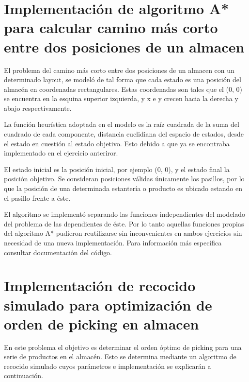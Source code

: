 \documentclass[
]{article}
\begin{document}
\hypertarget{implementaciuxf3n-de-algoritmo-a-para-calcular-camino-muxe1s-corto-entre-dos-posiciones-de-un-almacen}{%
\section{Implementación de algoritmo A* para calcular camino más corto
entre dos posiciones de un
almacen}\label{implementaciuxf3n-de-algoritmo-a-para-calcular-camino-muxe1s-corto-entre-dos-posiciones-de-un-almacen}}

El problema del camino más corto entre dos posiciones de un almacen con
un determinado layout, se modeló de tal forma que cada estado es una
posición del almacén en coordenadas rectangulares. Estas coordenadas son
tales que el (0, 0) se encuentra en la esquina superior izquierda, y x e
y crecen hacia la derecha y abajo respectivamente.

La función heurística adoptada en el modelo es la raíz cuadrada de la
suma del cuadrado de cada componente, distancia euclidiana del espacio
de estados, desde el estado en cuestión al estado objetivo. Esto debido
a que ya se encontraba implementado en el ejercicio anteriror.

El estado inicial es la posición inicial, por ejemplo (0, 0), y el
estado final la posición objetivo. Se consideran posiciones válidas
únicamente los pasillos, por lo que la posición de una determinada
estantería o producto es ubicado estando en el pasillo frente a éste.

El algoritmo se implementó separando las funciones independientes del
modelado del problema de las dependientes de éste. Por lo tanto aquellas
funciones propias del algoritmo A* pudieron reutilizarse sin
inconvenientes en ambos ejercicios sin necesidad de una nueva
implementación. Para información más específica consultar documentación
del código.

\hypertarget{implementaciuxf3n-de-recocido-simulado-para-optimizaciuxf3n-de-orden-de-picking-en-almacen}{%
\section{Implementación de recocido simulado para optimización de orden
de picking en
almacen}\label{implementaciuxf3n-de-recocido-simulado-para-optimizaciuxf3n-de-orden-de-picking-en-almacen}}

En este problema el objetivo es determinar el orden óptimo de picking
para una serie de productos en el almacén. Esto se determina mediante un
algoritmo de recocido simulado cuyos parámetros e implementación se
explicarán a continuación.
\end{document}
